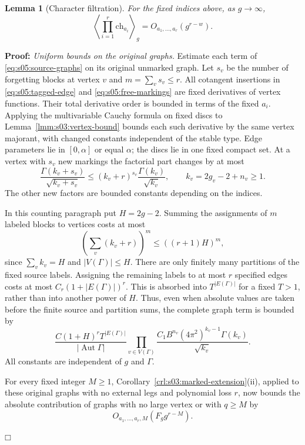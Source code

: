 \documentclass[a4paper,10pt]{article}
\numberwithin{equation}{section}
\theoremstyle{paperplain}
\newtheorem{lmm}[thm]{Lemma}
\theoremstyle{paperremark}
\theoremstyle{paperplain}
\newenvironment{prf}{\noindent \textbf{Proof: }}{\hfill $\mdlgwhtsquare$\par\addvspace{0.5\baselineskip}}
\begin{document}
\begin{lmm}[Character filtration]\label{lmm:s05:character-filtration}
For the fixed indices above, as $g\to\infty$,
\begin{equation}\label{eq:s05:character-bound}
 \left\langle\prod_{i=1}^r\mathrm{ch}_{a_i}\right\rangle_g
       =O_{a_1,\ldots,a_r}(g^{r-w}).
\end{equation}
\end{lmm}
\begin{prf}
\emph{Uniform bounds on the original graphs.}
Estimate each term of \eqref{eq:s05:source-graphs} on its original
unmarked graph.
Let $s_v$ be the number of forgetting blocks at vertex $v$ and
$m=\sum_v s_v\leq r$. All cotangent insertions in
\eqref{eq:s05:tagged-edge} and \eqref{eq:s05:free-markings} are
fixed derivatives of vertex functions. Their total derivative order
is bounded in terms of the fixed $a_i$. Applying the multivariable
Cauchy formula on fixed discs to
Lemma~\ref{lmm:s03:vertex-bound} bounds each such derivative by the
same vertex majorant, with changed constants independent of the
stable type. Edge parameters lie in $[0,\alpha]$ or equal $\alpha$;
the discs lie in one fixed compact set. At a vertex with $s_v$ new
markings the factorial part changes by at most
\[
 \frac{\Gamma(k_v+s_v)}{\sqrt{k_v+s_v}}
 \leq(k_v+r)^{s_v}\frac{\Gamma(k_v)}{\sqrt{k_v}},
 \qquad k_v=2g_v-2+n_v\geq1.
\]
The other new factors are bounded constants depending on the indices.

In this counting paragraph put $H=2g-2$. Summing the assignments of
$m$ labeled blocks to vertices costs at most
\[
 \left(\sum_v(k_v+r)\right)^m
 \leq((r+1)H)^m,
\]
since $\sum_v k_v=H$ and $|V(\Gamma)|\leq H$.
There are only finitely many partitions of the fixed source labels.
Assigning the remaining labels to at most $r$ specified edges costs
at most $C_r(1+|E(\Gamma)|)^r$. This is absorbed into
$T^{|E(\Gamma)|}$ for a fixed $T>1$, rather than into another power
of $H$. Thus, even when absolute values are taken before the finite
source and partition sums, the complete graph term is bounded by
\begin{equation}\label{eq:s05:source-majorant}
 \frac{C(1+H)^rT^{|E(\Gamma)|}}{|\operatorname{Aut}\Gamma|}
 \prod_{v\in V(\Gamma)}
 \frac{C_1B^{n_v}(4\pi^2)^{k_v-1}\Gamma(k_v)}{\sqrt{k_v}}.
\end{equation}
All constants are independent of $g$ and $\Gamma$.

For every fixed integer $M\geq1$,
Corollary~\ref{crl:s03:marked-extension}\textup{(ii)}, applied to
these original graphs with no external legs and polynomial loss $r$,
now bounds the absolute contribution of graphs with no large vertex
or with $q\geq M$ by
\begin{equation}\label{eq:s05:source-tail}
 O_{a_1,\ldots,a_r,M}(F_g g^{r-M}).
\end{equation}


\end{prf}
\end{document}
